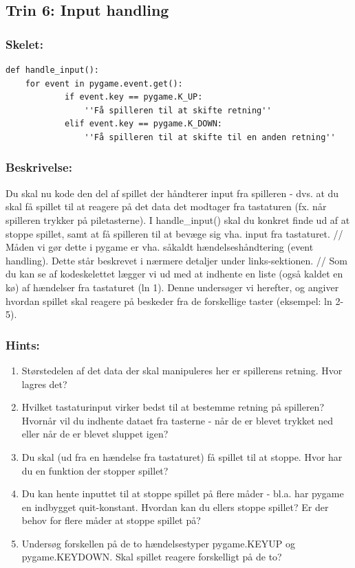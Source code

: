 \documentclass[10pt,a4paper,danish]{article}
\begin{document}
\subsection{Trin 6: Input handling}
\subsubsection{Skelet:} 
\begin{verbatim}
def handle_input():
    for event in pygame.event.get():
            if event.key == pygame.K_UP:
                ''Få spilleren til at skifte retning''
            elif event.key == pygame.K_DOWN:
                ''Få spilleren til at skifte til en anden retning''
\end{verbatim}
\subsubsection{Beskrivelse:}
Du skal nu kode den del af spillet der håndterer input fra spilleren - 
dvs. at du skal få spillet til at reagere på det data det modtager fra
tastaturen (fx. når spilleren trykker på piletasterne). I handle\_input() 
skal du konkret finde ud af at stoppe spillet, samt at få spilleren til 
at bevæge sig vha. input fra tastaturet. 
//
Måden vi gør dette i pygame er vha. såkaldt hændelseshåndtering (event
handling). Dette står beskrevet i nærmere detaljer under links-sektionen. 
//
Som du kan se af kodeskelettet lægger vi ud med at indhente en liste 
(også kaldet en kø) af hændelser fra tastaturet (ln 1). Denne undersøger 
vi herefter, og angiver hvordan spillet skal reagere på beskeder fra de 
forskellige taster (eksempel: ln 2-5). 

\subsubsection{Hints:}
\begin{enumerate}
\item Størstedelen af det data der skal manipuleres her er spillerens retning.
   Hvor lagres det?

\item Hvilket tastaturinput virker bedst til at bestemme retning på spilleren?
   Hvornår vil du indhente dataet fra tasterne - når de er blevet trykket ned
   eller når de er blevet sluppet igen?

\item Du skal (ud fra en hændelse fra tastaturet) få spillet til at stoppe. Hvor
   har du en funktion der stopper spillet?

\item Du kan hente inputtet til at stoppe spillet på flere måder - bl.a. har 
   pygame en indbygget quit-konstant. Hvordan kan du ellers stoppe spillet?
   Er der behov for flere måder at stoppe spillet på?

\item Undersøg forskellen på de to hændelsestyper pygame.KEYUP og pygame.KEYDOWN. 
   Skal spillet reagere forskelligt på de to?
\end{enumerate}
\end{document}
